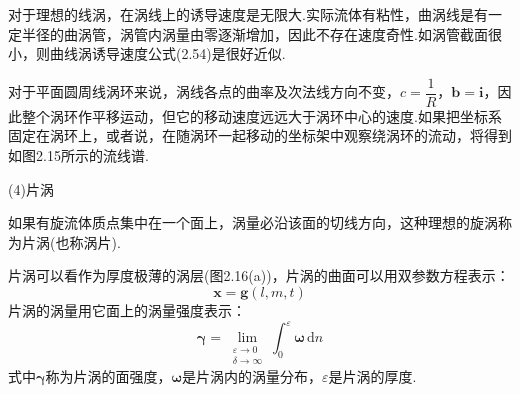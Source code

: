 对于理想的线涡，在涡线上的诱导速度是无限大.实际流体有粘性，曲涡线是有一定半径的曲涡管，涡管内涡量由零逐渐增加，因此不存在速度奇性.如涡管截面很小，则曲线涡诱导速度公式(2.54)是很好近似.

对于平面圆周线涡环来说，涡线各点的曲率及次法线方向不变，$c=\dfrac{1}{R}$，$\boldsymbol{b}=\boldsymbol{i}$，因此整个涡环作平移运动，但它的移动速度远远大于涡环中心的速度.如果把坐标系固定在涡环上，或者说，在随涡环一起移动的坐标架中观察绕涡环的流动，将得到如图2.15所示的流线谱.

(4)片涡

如果有旋流体质点集中在一个面上，涡量必沿该面的切线方向，这种理想的旋涡称为片涡(也称涡片).

片涡可以看作为厚度极薄的涡层(图2.16(a))，片涡的曲面可以用双参数方程表示：
\begin{equation*}
\boldsymbol{x}=\boldsymbol{g}(l,m,t)
\tag{2.55}
\end{equation*}
片涡的涡量用它面上的涡量强度表示：
\begin{equation*}
\boldsymbol{\gamma}=\lim_{\substack{\varepsilon\to 0\\ \delta\to\infty}}\int_0^{\varepsilon}\boldsymbol{\omega}\,\mathrm{d}n
\tag{2.56}
\end{equation*}
式中$\boldsymbol{\gamma}$称为片涡的面强度，$\boldsymbol{\omega}$是片涡内的涡量分布，$\varepsilon$是片涡的厚度.


